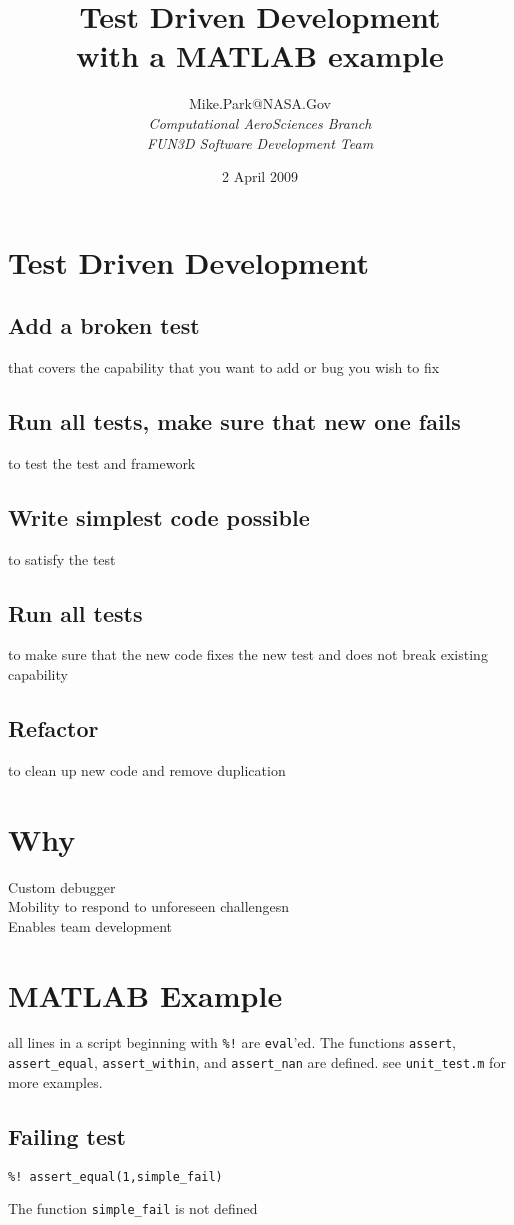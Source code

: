 \documentclass[twocolumn]{article}
\title{{\bfseries\Large Test Driven Development}\\ with a MATLAB example}
\author{
Mike.Park@NASA.Gov\\
	 {\itshape Computational AeroSciences Branch} \\
	 {\itshape FUN3D Software Development Team}
}
\date{2 April 2009}
\begin{document}
  
  \maketitle

  \section{Test Driven Development}
  \subsection{Add a broken test}
  that covers the capability that you want to add or bug you wish to fix
  \subsection{Run all tests, make sure that new one fails}
  to test the test and framework
  \subsection{Write simplest code possible}
  to satisfy the test
  \subsection{Run all tests}
  to make sure that the new code fixes the new test and does not break
  existing capability
  \subsection{Refactor}
  to clean up new code and remove duplication

  \section{Why}

  Custom debugger\\
  Mobility to respond to unforeseen challengesn\\
  Enables team development

  \section{MATLAB Example}
  all lines in a script beginning with \texttt{\%!} are \texttt{eval}'ed. 
  The functions \texttt{assert}, \texttt{assert\_equal}, 
  \texttt{assert\_within}, and \texttt{assert\_nan} are defined.
  see \texttt{unit\_test.m} for more examples.
  \subsection{Failing test}
  \begin{verbatim}
%! assert_equal(1,simple_fail)
  \end{verbatim}
  The function \texttt{simple\_fail} is not defined 
\end{document}
